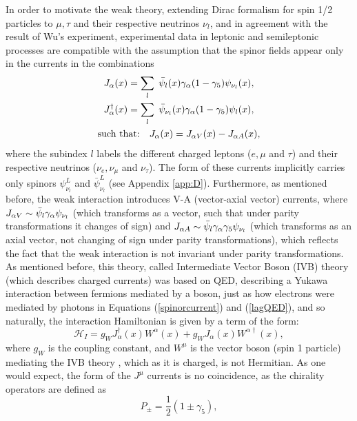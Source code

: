 In order to motivate the weak theory, extending Dirac formalism for spin 1/2 particles to $\mu, \tau$ and their respective neutrinos $\nu_l$, and in agreement with the result of Wu's experiment, experimental data in leptonic and semileptonic processes are compatible with the assumption that the spinor fields appear only in the currents in the combinations \cite{Mandl}
\begin{gather*}
    J_{\alpha}(x) = \sum_l \; \Bar{\psi}_l(x)\gamma_{\alpha}(1-\gamma_5)\psi_{\nu_l}(x), \\
    J^{\dagger}_{\alpha}(x) = \sum_l \; \Bar{\psi}_{\nu_l}(x)\gamma_{\alpha}(1-\gamma_5)\psi_l(x), \\
    \textrm{such that:} \quad J_{\alpha}(x) = J_{\alpha V}(x) - J_{\alpha A}(x),
\end{gather*}
where the subindex $l$ labels the different charged leptons ($e, \mu$ and $\tau$) and their respective neutrinos ($\nu_e, \nu_{\mu}$ and $\nu_{\tau}$). The form of these currents implicitly carries only spinors $\psi^L_{\nu_l}$ and $\bar{\psi}^L_{\nu_l}$ (see Appendix \ref{app:D}). Furthermore, as mentioned before, the weak interaction introduces V-A (vector-axial vector) currents, where $J_{\alpha V} \sim \Bar{\psi}_l\gamma_{\alpha}\psi_{\nu_l}$ (which transforms as a vector, such that under parity transformations it changes of sign) and $J_{\alpha A} \sim \Bar{\psi}_l\gamma_{\alpha}\gamma_5\psi_{\nu_l}$ (which transforms as an axial vector, not changing of sign under parity transformations), which reflects the fact that the weak interaction is not invariant under parity transformations. As mentioned before, this theory, called Intermediate Vector Boson (IVB) theory (which describes charged currents) was based on QED, describing a Yukawa interaction between fermions mediated by a boson, just as how electrons were mediated by photons in Equations (\ref{spinorcurrent}) and (\ref{lagQED}), and so naturally, the interaction Hamiltonian is given by a term of the form:
\begin{equation*}
    \mathcal{H}_I = g_WJ^{\dagger}_{\alpha}(x)W^{\alpha}(x) + g_WJ_{\alpha}(x)W^{\alpha\dagger}(x),
\end{equation*}
where $g_W$ is the coupling constant, and $W^{\mu}$ is the vector boson (spin 1 particle) mediating the IVB theory \cite{Mandl}, which as it is charged, is not Hermitian. As one would expect, the form of the $J^{\mu}$ currents is no coincidence, as the chirality operators are defined as
\begin{equation*}
    P_{\pm} = \dfrac{1}{2}(1 \pm \gamma_5),
\end{equation*}
